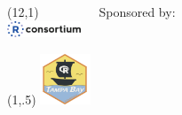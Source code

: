 \documentclass{beamer}
\begin{document}
\begin{frame}
\begin{textblock}{6}(12,1)
\tiny{~~~~~~~~~Sponsored by:}\\
\includegraphics[width=2.2cm, trim=0 0 0 0]{figures/RConsortium_Horizontal_Pantone.png}
\end{textblock}

\begin{textblock}{6}(1,.5)
\includegraphics[width=1.5cm, trim=0 0 0 0]{figures/trug-hex-800.png}
\end{textblock}

\end{frame}
\end{document}
